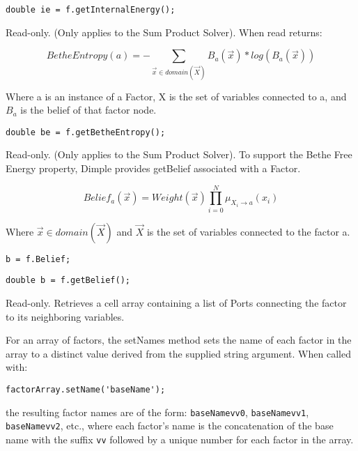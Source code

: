 \ifjava
\begin{lstlisting}
double ie = f.getInternalEnergy();
\end{lstlisting}
\fi

\label{sec:Factor.BetheEntropy}

Read-only.  (Only applies to the Sum Product Solver).  When read returns:

\[
BetheEntropy(a) = - \sum_{\vec{x} \in domain(\vec{X})}B_a(\vec{x})*log(B_a(\vec{x})) 
\]

Where a is an instance of a Factor, X is the set of variables connected to a, and $B_a$ is the belief of that factor node.
\ifmatlab
\begin{lstlisting}
double be = f.getBetheEntropy();
\end{lstlisting}
\fi

\label{sec:Factor.Belief}

Read-only.  (Only applies to the Sum Product Solver). To support the Bethe Free Energy property, Dimple provides getBelief associated with a Factor.

\[
Belief_a(\vec{x}) = Weight(\vec{x})\prod_{i=0}^N \mu_{X_i \rightarrow a}(x_i)
\]

Where $ \vec{x} \in domain(\vec{X}) $ and $ \vec{X} $ is the set of variables connected to the factor a.

\ifmatlab
\begin{lstlisting}
b = f.Belief;
\end{lstlisting}
\fi
\ifjava
\begin{lstlisting}
double b = f.getBelief();
\end{lstlisting}
\fi



Read-only.  Retrieves a cell array containing a list of Ports connecting the factor to its neighboring variables.


\ifmatlab
{}

\label{sec:Factor.setNames}

For an array of factors, the setNames method sets the name of each factor in the array to a distinct value derived from the supplied string argument.  When called with:

\begin{lstlisting}
factorArray.setName('baseName');
\end{lstlisting}

the resulting factor names are of the form: \texttt{baseName\textunderscore vv0}, \texttt{baseName\textunderscore vv1}, \texttt{baseName\textunderscore vv2}, etc., where each factor's name is the concatenation of the base name with the suffix \texttt{\textunderscore vv} followed by a unique number for each factor in the array.


